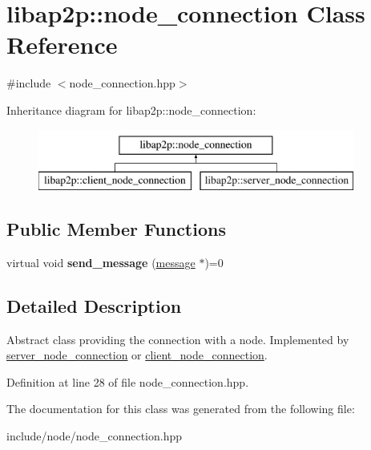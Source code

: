 \hypertarget{classlibap2p_1_1node__connection}{\section{libap2p\-:\-:node\-\_\-connection Class Reference}
\label{classlibap2p_1_1node__connection}
}


{\ttfamily \#include $<$node\-\_\-connection.\-hpp$>$}

Inheritance diagram for libap2p\-:\-:node\-\_\-connection\-:\begin{figure}[H]
\begin{center}
\leavevmode
\includegraphics[height=2.000000cm]{classlibap2p_1_1node__connection}
\end{center}
\end{figure}
\subsection*{Public Member Functions}
\begin{DoxyCompactItemize}
\item 
\hypertarget{classlibap2p_1_1node__connection_ad880fcd549c6e831ff97861cf1bf6f43}{virtual void {\bfseries send\-\_\-message} (\hyperlink{classlibap2p_1_1message}{message} $\ast$)=0}\label{classlibap2p_1_1node__connection_ad880fcd549c6e831ff97861cf1bf6f43}

\end{DoxyCompactItemize}


\subsection{Detailed Description}
Abstract class providing the connection with a node. Implemented by \hyperlink{classlibap2p_1_1server__node__connection}{server\-\_\-node\-\_\-connection} or \hyperlink{classlibap2p_1_1client__node__connection}{client\-\_\-node\-\_\-connection}. 

Definition at line 28 of file node\-\_\-connection.\-hpp.



The documentation for this class was generated from the following file\-:\begin{DoxyCompactItemize}
\item 
include/node/node\-\_\-connection.\-hpp\end{DoxyCompactItemize}
